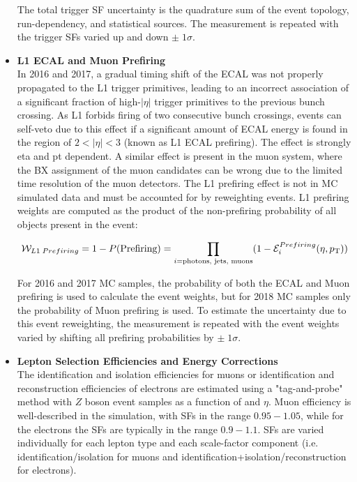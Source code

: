 \begin{itemize}
    The total trigger SF uncertainty is the quadrature sum of the event topology, run-dependency, and statistical sources.
    The measurement is repeated with the trigger SFs varied up and down $\pm \; 1 \sigma$.
    \item {\bf L1 ECAL and Muon Prefiring} \\
    In 2016 and 2017, a gradual timing shift of the ECAL was not properly propagated to the L1 trigger primitives, leading to an incorrect association of a significant fraction of high-$\vert \eta \vert$ trigger primitives to the previous bunch crossing.
    As L1 forbids firing of two consecutive bunch crossings, events can self-veto due to this effect if a significant amount of ECAL energy is found in the region of $2<\vert \eta \vert<3$ (known as L1 ECAL prefiring).
    The effect is strongly eta and pt dependent.
    A similar effect is present in the muon system, where the BX assignment of the muon candidates can be wrong due to the limited time resolution of the muon detectors. 
    The L1 prefiring effect is not in MC simulated data and must be accounted for by reweighting events.
    L1 prefiring weights are computed as the product of the non-prefiring probability of all objects present in the event:
    \begin{linenomath*}
    \begin{align}
    \mathcal{W}_{L1 \; Prefiring} = 1 - P(\text{Prefiring}) = \prod_{i=\text{photons, jets, muons}} (1 - \mathcal{E}_i^{Prefiring} (\eta, p_{\mathrm{T}}))
    \end{align}
    \end{linenomath*}
    For 2016 and 2017 MC samples, the probability of both the ECAL and Muon prefiring is used to calculate the event weights, but for 2018 MC samples only the probability of Muon prefiring is used.
    To estimate the uncertainty due to this event reweighting, the measurement is repeated with the event weights varied by shifting all prefiring probabilities by $\pm \; 1 \sigma$.
    \item {\bf Lepton Selection Efficiencies and Energy Corrections} \\
    The identification and isolation efficiencies for muons or identification and reconstruction efficiencies of electrons are estimated using a "tag-and-probe" method with $Z$ boson event samples as a function of \pT and $\eta$. 
    Muon efficiency is well-described in the simulation, with SFs in the range $0.95 - 1.05$, while for the electrons the SFs are typically in the range $0.9 - 1.1$. 
    SFs are varied individually for each lepton type and each scale-factor component (i.e. identification/isolation for muons and identification+isolation/reconstruction for electrons). 

\end{itemize}
